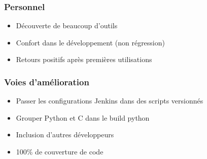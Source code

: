 \documentclass[9pt]{beamer}
\begin{document}
\subsubsection{Personnel}
\begin{frame}{\subsubsecname}{\subsecname}
  \begin{itemize}
    \item Découverte de beaucoup d'outils
    \item Confort dans le développement (non régression)
    \item Retours positifs après premières utilisations
  \end{itemize}
\end{frame}

\subsubsection{Voies d'amélioration}
\begin{frame}{\subsubsecname}{\subsecname}
  \begin{itemize}
    \item Passer les configurations Jenkins dans des scripts versionnés
    \item Grouper Python et C dans le build python
    \item Inclusion d'autres développeurs
    \item 100\% de couverture de code
  \end{itemize}
\end{frame}
\end{document}
